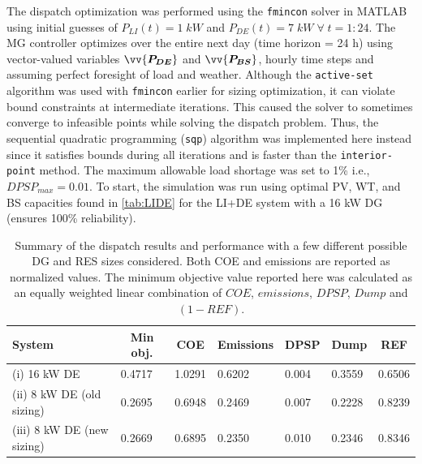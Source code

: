 \documentclass[final,3p,times]{elsarticle}
\begin{document}
The dispatch optimization was performed using the \texttt{fmincon} solver in MATLAB using initial guesses of $P_{LI}(t) = 1 \; kW$ and $P_{DE}(t) = 7 \; kW \; \forall \; t = 1:24$. The MG controller optimizes over the entire next day (time horizon = 24 h) using vector-valued variables $\vv{\bm{P_{DE}}}$ and $\vv{\bm{P_{BS}}}$, hourly time steps and assuming perfect foresight of load and weather. Although the \texttt{active-set} algorithm was used with \texttt{fmincon} earlier for sizing optimization, it can violate bound constraints at intermediate iterations. This caused the solver to sometimes converge to infeasible points while solving the dispatch problem. Thus, the sequential quadratic programming (\texttt{sqp}) algorithm was implemented here instead since it satisfies bounds during all iterations and is faster than the \texttt{interior-point} method. The maximum allowable load shortage was set to 1\% i.e., $DPSP_{max} = 0.01$. To start, the simulation was run using optimal PV, WT, and BS capacities found in \cref{tab:LIDE} for the LI+DE system with a 16 kW DG (ensures 100\% reliability).   

\begin{table}[htbp]
\centering
\begin{tabular}{p{5cm} p{0.1cm} p{0.1cm} p{0.1cm} p{0.1cm} p{0.1cm} p{0.1cm}}
\toprule
\multicolumn{1}{l}{\textbf{System}} & \multicolumn{1}{c}{\textbf{Min obj.}} & \multicolumn{1}{c}{\textbf{COE}} & \multicolumn{1}{c}{\textbf{Emissions}} & \multicolumn{1}{c}{\textbf{DPSP}} & \multicolumn{1}{c}{\textbf{Dump}} & \multicolumn{1}{c}{\textbf{REF}} \\
\midrule
(i) 16 kW DE & 0.4717 & 1.0291 & 0.6202  & 0.004 & 0.3559 & 0.6506     \\
(ii) 8 kW DE (old sizing) & 0.2695 & 0.6948 & 0.2469 & 0.007 & 0.2228 & 0.8239 
 \\
(iii) 8 kW DE (new sizing) & 0.2669 & 0.6895 & 0.2350 & 0.010 & 0.2346 & 0.8346   \\
\bottomrule
\end{tabular}
\caption{\label{tab:DG_size} Summary of the dispatch results and performance with a few different possible DG and RES sizes considered. Both COE and emissions are reported as normalized values. The minimum objective value reported here was calculated as an equally weighted linear combination of $COE$, $emissions$, $DPSP$, $Dump$ and $(1-REF)$.}
\end{table}
\end{document}
